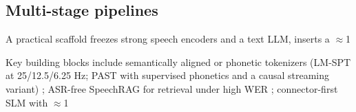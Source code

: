 \documentclass{article}
\begin{document}
\subsection{Multi-stage pipelines} \label{subsec:multi-stagepipelines}
A practical scaffold freezes strong speech encoders and a text LLM, inserts a $\approx$1%

Key building blocks include semantically aligned or phonetic tokenizers (LM-SPT at 25/12.5/6.25 Hz; PAST with supervised phonetics and a causal streaming variant) \cite{jo2025lmsptalignedsemanticdistillationspeechto,har-tuv2025pastphoneticacousticspeechtokenizer}; ASR-free SpeechRAG for retrieval under high WER \cite{min2025speechretrievalaugmentedgenerationwithou}; connector-first SLM with $\approx$1%
\end{document}
